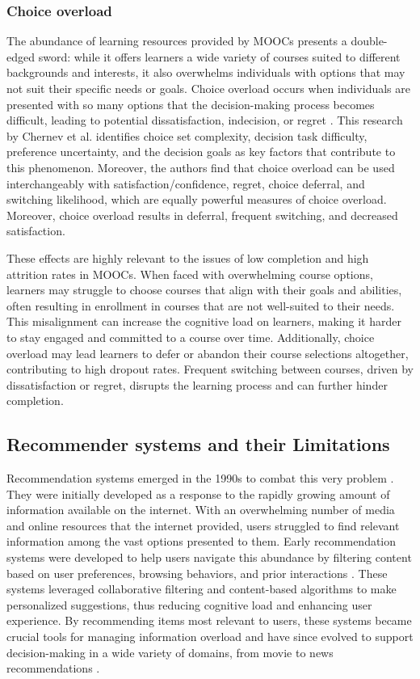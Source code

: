 \subsubsection{Choice overload}

The abundance of learning resources provided by MOOCs presents a double-edged sword: while it offers learners a wide variety of courses suited to different backgrounds and interests, it also overwhelms individuals with options that may not suit their specific needs or goals. Choice overload occurs when individuals are presented with so many options that the decision-making process becomes difficult, leading to potential dissatisfaction, indecision, or regret  \cite{chernev_choice_2015}. This research by Chernev et al. identifies choice set complexity, decision task difficulty, preference uncertainty, and the decision goals as key factors that contribute to this phenomenon. Moreover, the authors find that choice overload can be used interchangeably with satisfaction/confidence, regret, choice deferral, and switching likelihood, which are equally powerful measures of choice overload. Moreover, choice overload results in deferral, frequent switching, and decreased satisfaction. 

These effects are highly relevant to the issues of low completion and high attrition rates in MOOCs. When faced with overwhelming course options, learners may struggle to choose courses that align with their goals and abilities, often resulting in enrollment in courses that are not well-suited to their needs. This misalignment can increase the cognitive load on learners, making it harder to stay engaged and committed to a course over time. Additionally, choice overload may lead learners to defer or abandon their course selections altogether, contributing to high dropout rates. Frequent switching between courses, driven by dissatisfaction or regret, disrupts the learning process and can further hinder completion.

\subsection{Recommender systems and their Limitations} 

Recommendation systems emerged in the 1990s to combat this very problem \cite{goldberg_using_1992}. They were initially developed as a response to the rapidly growing amount of information available on the internet. With an overwhelming number of media and online resources that the internet provided, users struggled to find relevant information among the vast options presented to them. Early recommendation systems were developed to help users navigate this abundance by filtering content based on user preferences, browsing behaviors, and prior interactions \cite{lutz_mafiaactive_1990}. These systems leveraged collaborative filtering and content-based algorithms to make personalized suggestions, thus reducing cognitive load and enhancing user experience. By recommending items most relevant to users, these systems became crucial tools for managing information overload and have since evolved to support decision-making in a wide variety of domains, from movie \cite{dong_brief_2022} to news recommendations \cite{resnick_grouplens_1994}.

